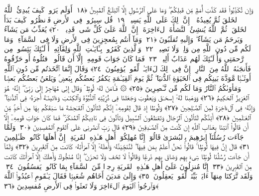  وَإِن تُكَذِّبُوا۟ فَقَد كَذَّبَ أُمَمٌۭ مِّن قَبلِكُم ۖ وَمَا عَلَى ٱلرَّسُولِ إِلَّا ٱلبَلَـٰغُ ٱلمُبِينُ ﴿١٨﴾
 أَوَلَم يَرَوا۟ كَيفَ يُبدِئُ ٱللَّهُ ٱلخَلقَ ثُمَّ يُعِيدُهُۥٓ ۚ إِنَّ ذَٟلِكَ عَلَى ٱللَّهِ يَسِيرٌۭ ﴿١٩﴾
 قُل سِيرُوا۟ فِى ٱلأَرضِ فَٱنظُرُوا۟ كَيفَ بَدَأَ ٱلخَلقَ ۚ ثُمَّ ٱللَّهُ يُنشِئُ ٱلنَّشأَةَ ٱلءَاخِرَةَ ۚ إِنَّ ٱللَّهَ عَلَىٰ كُلِّ شَىءٍۢ قَدِيرٌۭ ﴿٢٠﴾
 يُعَذِّبُ مَن يَشَآءُ وَيَرحَمُ مَن يَشَآءُ ۖ وَإِلَيهِ تُقلَبُونَ ﴿٢١﴾
 وَمَآ أَنتُم بِمُعجِزِينَ فِى ٱلأَرضِ وَلَا فِى ٱلسَّمَآءِ ۖ وَمَا لَكُم مِّن دُونِ ٱللَّهِ مِن وَلِىٍّۢ وَلَا نَصِيرٍۢ ﴿٢٢﴾
 وَٱلَّذِينَ كَفَرُوا۟ بِـَٔايَـٰتِ ٱللَّهِ وَلِقَآئِهِۦٓ أُو۟لَـٰٓئِكَ يَئِسُوا۟ مِن رَّحمَتِى وَأُو۟لَـٰٓئِكَ لَهُم عَذَابٌ أَلِيمٌۭ ﴿٢٣﴾
 فَمَا كَانَ جَوَابَ قَومِهِۦٓ إِلَّآ أَن قَالُوا۟ ٱقتُلُوهُ أَو حَرِّقُوهُ فَأَنجَىٰهُ ٱللَّهُ مِنَ ٱلنَّارِ ۚ إِنَّ فِى ذَٟلِكَ لَءَايَـٰتٍۢ لِّقَومٍۢ يُؤمِنُونَ ﴿٢٤﴾
 وَقَالَ إِنَّمَا ٱتَّخَذتُم مِّن دُونِ ٱللَّهِ أَوثَـٰنًۭا مَّوَدَّةَ بَينِكُم فِى ٱلحَيَوٰةِ ٱلدُّنيَا ۖ ثُمَّ يَومَ ٱلقِيَـٰمَةِ يَكفُرُ بَعضُكُم بِبَعضٍۢ وَيَلعَنُ بَعضُكُم بَعضًۭا وَمَأوَىٰكُمُ ٱلنَّارُ وَمَا لَكُم مِّن نَّـٰصِرِينَ ﴿٢٥﴾
 ۞ فَـَٔامَنَ لَهُۥ لُوطٌۭ ۘ وَقَالَ إِنِّى مُهَاجِرٌ إِلَىٰ رَبِّىٓ ۖ إِنَّهُۥ هُوَ ٱلعَزِيزُ ٱلحَكِيمُ ﴿٢٦﴾
 وَوَهَبنَا لَهُۥٓ إِسحَـٰقَ وَيَعقُوبَ وَجَعَلنَا فِى ذُرِّيَّتِهِ ٱلنُّبُوَّةَ وَٱلكِتَـٰبَ وَءَاتَينَـٰهُ أَجرَهُۥ فِى ٱلدُّنيَا ۖ وَإِنَّهُۥ فِى ٱلءَاخِرَةِ لَمِنَ ٱلصَّـٰلِحِينَ ﴿٢٧﴾
 وَلُوطًا إِذ قَالَ لِقَومِهِۦٓ إِنَّكُم لَتَأتُونَ ٱلفَـٰحِشَةَ مَا سَبَقَكُم بِهَا مِن أَحَدٍۢ مِّنَ ٱلعَـٰلَمِينَ ﴿٢٨﴾
 أَئِنَّكُم لَتَأتُونَ ٱلرِّجَالَ وَتَقطَعُونَ ٱلسَّبِيلَ وَتَأتُونَ فِى نَادِيكُمُ ٱلمُنكَرَ ۖ فَمَا كَانَ جَوَابَ قَومِهِۦٓ إِلَّآ أَن قَالُوا۟ ٱئتِنَا بِعَذَابِ ٱللَّهِ إِن كُنتَ مِنَ ٱلصَّـٰدِقِينَ ﴿٢٩﴾
 قَالَ رَبِّ ٱنصُرنِى عَلَى ٱلقَومِ ٱلمُفسِدِينَ ﴿٣٠﴾
 وَلَمَّا جَآءَت رُسُلُنَآ إِبرَٰهِيمَ بِٱلبُشرَىٰ قَالُوٓا۟ إِنَّا مُهلِكُوٓا۟ أَهلِ هَـٰذِهِ ٱلقَريَةِ ۖ إِنَّ أَهلَهَا كَانُوا۟ ظَـٰلِمِينَ ﴿٣١﴾
 قَالَ إِنَّ فِيهَا لُوطًۭا ۚ قَالُوا۟ نَحنُ أَعلَمُ بِمَن فِيهَا ۖ لَنُنَجِّيَنَّهُۥ وَأَهلَهُۥٓ إِلَّا ٱمرَأَتَهُۥ كَانَت مِنَ ٱلغَٰبِرِينَ ﴿٣٢﴾
 وَلَمَّآ أَن جَآءَت رُسُلُنَا لُوطًۭا سِىٓءَ بِهِم وَضَاقَ بِهِم ذَرعًۭا وَقَالُوا۟ لَا تَخَف وَلَا تَحزَن ۖ إِنَّا مُنَجُّوكَ وَأَهلَكَ إِلَّا ٱمرَأَتَكَ كَانَت مِنَ ٱلغَٰبِرِينَ ﴿٣٣﴾
 إِنَّا مُنزِلُونَ عَلَىٰٓ أَهلِ هَـٰذِهِ ٱلقَريَةِ رِجزًۭا مِّنَ ٱلسَّمَآءِ بِمَا كَانُوا۟ يَفسُقُونَ ﴿٣٤﴾
 وَلَقَد تَّرَكنَا مِنهَآ ءَايَةًۢ بَيِّنَةًۭ لِّقَومٍۢ يَعقِلُونَ ﴿٣٥﴾
 وَإِلَىٰ مَديَنَ أَخَاهُم شُعَيبًۭا فَقَالَ يَـٰقَومِ ٱعبُدُوا۟ ٱللَّهَ وَٱرجُوا۟ ٱليَومَ ٱلءَاخِرَ وَلَا تَعثَوا۟ فِى ٱلأَرضِ مُفسِدِينَ ﴿٣٦﴾
